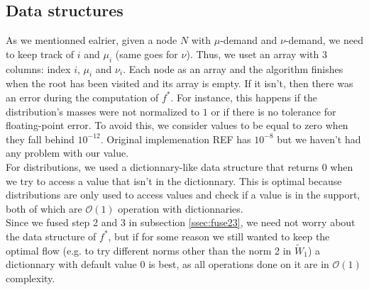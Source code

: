 \documentclass{article}
\begin{document}
\subsection{Data structures}
As we mentionned ealrier, given a node $N$ with $\mu$-demand and $\nu$-demand, we need to keep track of $i$ and $\mu_i$ (same goes for $\nu$). Thus, we uset an array with 3 columns: index $i$, $\mu_i$ and $\nu_i$. Each node as an array and the algorithm finishes when the root has been visited and its array is empty. If it isn't, then there was an error during the computation of $f^*$. For instance, this happens if the distribution's masses were not normalized to $1$ or if there is no tolerance for floating-point error. To avoid this, we consider values to be equal to zero when they fall behind $10^{-12}$. Original implemenation REF has $10^{-8}$ but we haven't had any problem with our value.\\ 
For distributions, we used a dictionnary-like data structure that returns $0$ when we try to access a value that isn't in the dictionnary. This is optimal because distributions are only used to access values and check if a value is in the support, both of which are $\mathcal{O}(1)$ operation with dictionnaries.\\
Since we fused step 2 and 3 in subsection \ref{ssec:fuse23}, we need not worry about the data structure of $f^*$, but if for some reason we still wanted to keep the optimal flow (e.g. to try different norms other than the norm 2 in $\widetilde{W}_1$) a dictionnary with default value $0$ is best, as all operations done on it are in $\mathcal{O}(1)$ complexity.
\end{document}
